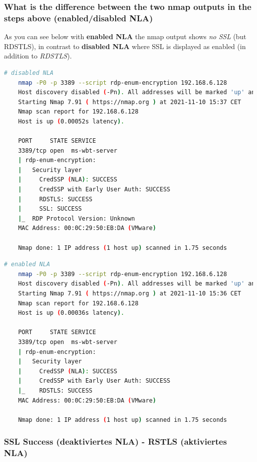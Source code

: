 \subsubsection{What is the difference between the two nmap outputs in the steps above (enabled/disabled NLA)}
As you can see below with \textbf{enabled NLA} the nmap output shows \textit{no SSL} (but RDSTLS), in contrast to \textbf{disabled NLA} where SSL is displayed as enabled (in addition to \textit{RDSTLS}).

\begin{lstlisting}[language=bash]
    # disabled NLA
    nmap -P0 -p 3389 --script rdp-enum-encryption 192.168.6.128
    Host discovery disabled (-Pn). All addresses will be marked 'up' and scan times will be slower.
    Starting Nmap 7.91 ( https://nmap.org ) at 2021-11-10 15:37 CET
    Nmap scan report for 192.168.6.128
    Host is up (0.00052s latency).

    PORT     STATE SERVICE
    3389/tcp open  ms-wbt-server
    | rdp-enum-encryption:
    |   Security layer
    |     CredSSP (NLA): SUCCESS
    |     CredSSP with Early User Auth: SUCCESS
    |     RDSTLS: SUCCESS
    |     SSL: SUCCESS
    |_  RDP Protocol Version: Unknown
    MAC Address: 00:0C:29:50:EB:DA (VMware)

    Nmap done: 1 IP address (1 host up) scanned in 1.75 seconds
\end{lstlisting}

\begin{lstlisting}[language=bash]
    # enabled NLA
    nmap -P0 -p 3389 --script rdp-enum-encryption 192.168.6.128
    Host discovery disabled (-Pn). All addresses will be marked 'up' and scan times will be slower.
    Starting Nmap 7.91 ( https://nmap.org ) at 2021-11-10 15:36 CET
    Nmap scan report for 192.168.6.128
    Host is up (0.00036s latency).

    PORT     STATE SERVICE
    3389/tcp open  ms-wbt-server
    | rdp-enum-encryption:
    |   Security layer
    |     CredSSP (NLA): SUCCESS
    |     CredSSP with Early User Auth: SUCCESS
    |_    RDSTLS: SUCCESS
    MAC Address: 00:0C:29:50:EB:DA (VMware)

    Nmap done: 1 IP address (1 host up) scanned in 1.75 seconds
\end{lstlisting}

\subsubsection{SSL Success (deaktiviertes NLA) - RSTLS (aktiviertes NLA)}

